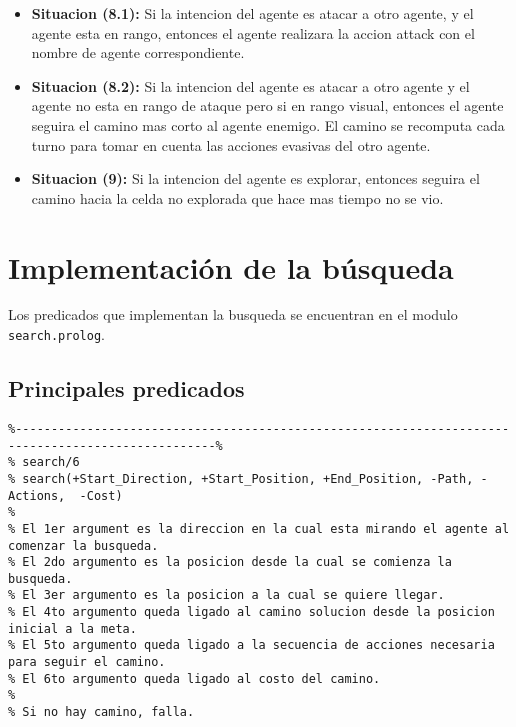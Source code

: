 \documentclass[a4paper,12pt]{report}
\begin{document}
\begin{itemize}
\item \textbf{Situacion (8.1):}
Si la intencion del agente es atacar a otro agente, y el agente esta en rango, entonces el agente
realizara la accion attack con el nombre de agente correspondiente. 

\item \textbf{Situacion (8.2):}
Si la intencion del agente es atacar a otro agente y el agente no esta en rango de ataque pero si
en rango visual, entonces el agente seguira el camino mas corto al agente enemigo.
El camino se recomputa cada turno para tomar en cuenta las acciones evasivas del otro agente.

\item \textbf{Situacion (9):}
Si la intencion del agente es explorar, entonces seguira el camino hacia la celda no explorada
que hace mas tiempo no se vio. 

\end{itemize}

\section{Implementaci\'{o}n de la b\'{u}squeda}

Los predicados que implementan la busqueda se encuentran en el modulo \texttt{search.prolog}.

\subsection{Principales predicados}

\begin{scriptsize}
\begin{verbatim}
%--------------------------------------------------------------------------------------------------%
% search/6
% search(+Start_Direction, +Start_Position, +End_Position, -Path, -Actions,  -Cost)
%
% El 1er argument es la direccion en la cual esta mirando el agente al comenzar la busqueda.
% El 2do argumento es la posicion desde la cual se comienza la busqueda.
% El 3er argumento es la posicion a la cual se quiere llegar. 
% El 4to argumento queda ligado al camino solucion desde la posicion inicial a la meta. 
% El 5to argumento queda ligado a la secuencia de acciones necesaria para seguir el camino.
% El 6to argumento queda ligado al costo del camino.
%
% Si no hay camino, falla.
\end{verbatim}
\end{scriptsize}
\end{document}
